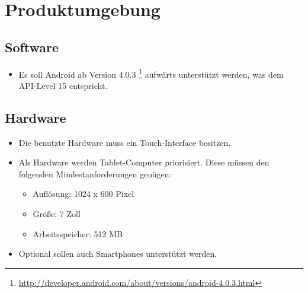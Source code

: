 \section{Produktumgebung}

\subsection{Software}
\begin{itemize}
	\item Es soll Android ab Version 4.0.3 \footnote{\url{http://developer.android.com/about/versions/android-4.0.3.html}} aufwärts unterstützt werden, was dem API-Level 15 entspricht.
\end{itemize}
\subsection{Hardware}
\begin{itemize}
	\item Die benutzte Hardware muss ein Touch-Interface besitzen.
	\item Als Hardware werden Tablet-Computer priorisiert. Diese müssen den folgenden Mindestanforderungen genügen:
	\begin{itemize}
		\item Auflösung: 1024 x 600 Pixel
		\item Größe: 7 Zoll
		\item Arbeitsspeicher: 512 MB
	\end{itemize}
	\item Optional sollen auch Smartphones unterstützt werden.
\end{itemize}

